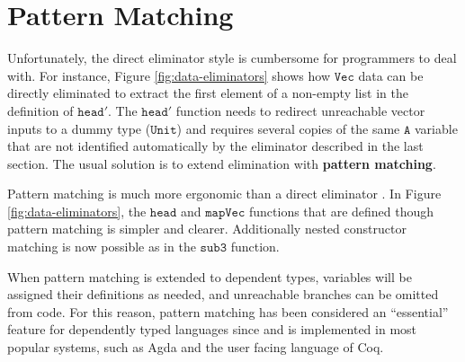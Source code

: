 
\section{Pattern Matching}

Unfortunately, the direct eliminator style is cumbersome for programmers to deal with.
For instance, Figure \ref{fig:data-eliminators} shows how $\mathtt{Vec}$ data can be directly eliminated to extract the first element of a non-empty list in the definition of $\mathtt{head'}$.
The $\mathtt{head'}$ function needs to redirect unreachable vector inputs to a dummy type ($\mathtt{Unit}$) and requires several copies of the same $\mathtt{A}$ variable that are not identified automatically by the eliminator described in the last section.
The usual solution is to extend \case{} elimination with \textbf{pattern matching}.
 
Pattern matching is much more ergonomic than a direct eliminator \case{}.
In Figure \ref{fig:data-eliminators}, the $\mathtt{head}$ and $\mathtt{mapVec}$ functions that are defined though pattern matching is simpler and clearer.
Additionally nested constructor matching is now possible as in the $\mathtt{sub3}$ function.

When pattern matching is extended to dependent types, variables will be assigned their definitions as needed, and unreachable branches can be omitted from code.
For this reason, pattern matching has been considered an ``essential'' feature for dependently typed languages since \cite{coquand1992pattern} and is implemented in most popular systems, such as Agda and the user facing language of Coq.


